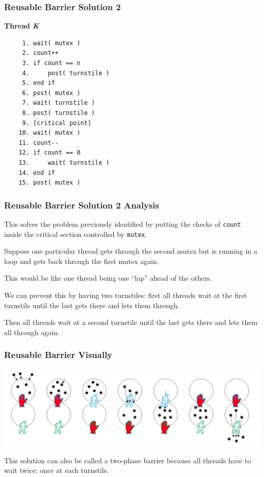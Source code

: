 \begin{frame}[fragile]
	\frametitle{Reusable Barrier Solution 2}

	\textbf{Thread \textit{K}}\vspace{-2em}
	\begin{verbatim}
	 1. wait( mutex )
	 2. count++
	 3. if count == n
	 4.     post( turnstile )
	 5. end if
	 6. post( mutex )
	 7. wait( turnstile )
	 8. post( turnstile )
	 9. [critical point]
	10. wait( mutex )
	11. count--
	12. if count == 0
	13.     wait( turnstile )
	14. end if
	15. post( mutex )
  \end{verbatim}
	\vspace{-2em}

\end{frame}


\begin{frame}
	\frametitle{Reusable Barrier Solution 2 Analysis}

	This solves the problem previously identified by putting the checks of \texttt{count} inside the critical section controlled by \texttt{mutex}.

	Suppose one particular thread gets through the second mutex but is running in a loop and gets back through the first mutex again.

	This would be like one thread being one ``lap'' ahead of the others.

	We can prevent this by having two turnstiles: first all threads wait at the first turnstile until the last gets there and lets them through.

	Then all threads wait at a second turnstile until the last gets there and lets them all through again.


\end{frame}

\begin{frame}
	\frametitle{Reusable Barrier Visually}

	\begin{center}
		\includegraphics[width=\textwidth]{images/reusable-barrier.png}
	\end{center}

	This solution can also be called a \alert{two-phase barrier} because all threads have to wait twice: once at each turnstile.

\end{frame}

